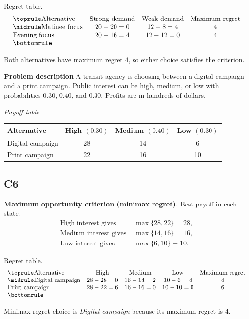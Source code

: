 \begin{ExamProblems}
		Regret table.
		\[
		\begin{array}{lccc}
			\toprule
			\text{Alternative} & \text{Strong demand} & \text{Weak demand} & \text{Maximum regret}\\
			\midrule
			\text{Matinee focus} & 20-20=0 & 12-8=4 & 4\\
			\text{Evening focus} & 20-16=4 & 12-12=0 & 4\\
			\bottomrule
		\end{array}
		\]

		Both alternatives have maximum regret $4$, so either choice satisfies the criterion.

		\item
		\textbf{Problem description}
		A transit agency is choosing between a digital campaign and a print campaign. Public interest can be high, medium, or low with probabilities $0.30$, $0.40$, and $0.30$. Profits are in hundreds of dollars.

		\begin{center}
			\textit{Payoff table}\\
			\begin{tabular}{l c c c}
				\toprule
				Alternative & High $(0.30)$ & Medium $(0.40)$ & Low $(0.30)$ \\
				\midrule
				Digital campaign & 28 & 14 & 6 \\
				Print campaign & 22 & 16 & 10 \\
				\bottomrule
			\end{tabular}
		\end{center}

		\subsection*{C6}
		\textbf{Maximum opportunity criterion (minimax regret).} Best payoff in each state.
		\[
		\begin{aligned}
		\text{High interest gives } &\max\{28,22\}=28,\\
		\text{Medium interest gives } &\max\{14,16\}=16,\\
		\text{Low interest gives } &\max\{6,10\}=10.
		\end{aligned}
		\]

		Regret table.
		\[
		\begin{array}{lcccc}
			\toprule
			\text{Alternative} & \text{High} & \text{Medium} & \text{Low} & \text{Maximum regret}\\
			\midrule
			\text{Digital campaign} & 28-28=0 & 16-14=2 & 10-6=4 & 4\\
			\text{Print campaign} & 28-22=6 & 16-16=0 & 10-10=0 & 6\\
			\bottomrule
		\end{array}
		\]

		Minimax regret choice is \emph{Digital campaign} because its maximum regret is $4$.
	\end{ExamProblems}


